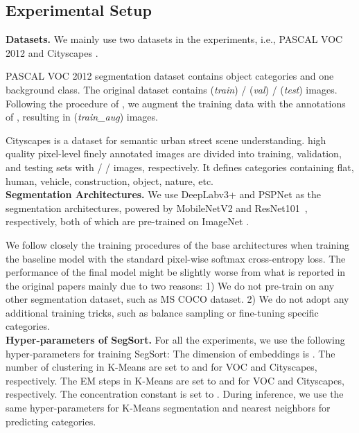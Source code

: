 \documentclass[10pt,twocolumn,letterpaper]{article}
\begin{document}
\subsection{Experimental Setup}
\label{sec:exp_setup}

\noindent \textbf{Datasets.} We mainly use two datasets in the experiments, i.e., 
PASCAL VOC 2012 \cite{pascal-voc-2012} and Cityscapes \cite{cordts2016cityscapes}. 

PASCAL VOC 2012 \cite{pascal-voc-2012} segmentation dataset contains  object categories and one background class. The original dataset contains  ({\it train}) /  ({\it val}) /  ({\it test}) images.  Following the procedure of \cite{long2015fully, chen2016deeplab,zhao2016pyramid}, we augment the training data with the annotations of \cite{hariharan2011semantic}, resulting in  ({\it train\_aug}) images. 

Cityscapes \cite{cordts2016cityscapes} is a dataset for semantic urban street scene understanding.   high quality pixel-level finely annotated images are divided into  training, validation, and testing sets with  /  /  images, respectively. It defines  categories containing flat, human, vehicle, construction, object, nature, etc. \\

\vspace{-6pt}
\noindent \textbf{Segmentation Architectures.} We use DeepLabv3+ \cite{deeplabv3plus2018} and PSPNet \cite{zhao2016pyramid} as the segmentation architectures, powered by MobileNetV2 \cite{mobilenetv22018} and ResNet101~\cite{he2016deep}, respectively, both of which are pre-trained on ImageNet \cite{krizhevsky2012imagenet}.

We follow closely the training procedures of the base architectures when training the baseline model with the standard pixel-wise softmax cross-entropy loss. The performance of the final model might be slightly worse from what is reported in the original papers mainly due to two reasons: 1) We do not pre-train on any other segmentation dataset, such as MS COCO \cite{lin2014microsoft} dataset. 2) We do not adopt any additional training tricks, such as balance sampling or fine-tuning specific categories. \\


\vspace{-6pt}
\noindent \textbf{Hyper-parameters of SegSort.}
For all the experiments, we use the following hyper-parameters for training SegSort: The dimension of embeddings is . The number of clustering in K-Means are set to  and  for VOC and Cityscapes, respectively. The EM steps in K-Means are set to  and  for VOC and Cityscapes, respectively. The concentration constant is set to . During inference, we use the same hyper-parameters for K-Means segmentation and  nearest neighbors for predicting categories.
\end{document}
